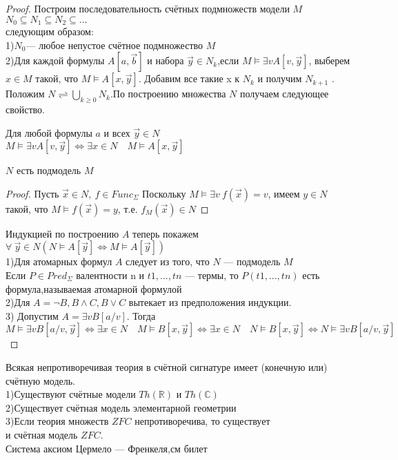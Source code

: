 \begin{proof}
	Построим последовательность счётных подмножеств модели $M$\\
	$N_{0} \subseteq N_{1} \subseteq N_{2} \subseteq \ldots$\\
	следующим образом:\\
	1)$N_0$— любое непустое счётное подмножество $M$\\
	2)Для каждой формулы $A[a, \vec{b}]$ и набора $\vec{y} \in N_{k}$,если $M \vDash \exists v A[v, \vec{y}]$,
	выберем $x \in M$
	такой, что $M \vDash A[x, \vec{y}]$. Добавим все такие x к $N_k$ и получим $N_{k+1}$ .\\
	Положим $N \rightleftharpoons \bigcup_{k \geq 0} N_{k}$.По построению множества $N$ получаем следующее
	свойство.
	\begin{lemma}
		Для любой формулы $a$ и всех $\vec{y} \in N$\\
		$M \vDash \exists v A[v, \vec{y}] \Longleftrightarrow \exists x \in N \quad M \vDash A[x, \vec{y}]$
	\end{lemma}
	\begin{lemma}
		$N$ есть подмодель $M$
	\end{lemma}
	\begin{proof}
		Пусть $\vec{x} \in N,\:f\in Func_\Sigma$ Поскольку $M \vDash \exists v \: f(\vec{x})=v$, имеем $y\in N$
		такой, что $M \vDash f(\vec{x})=y$, т.е. $f_M(\vec{x})\in N$
	\end{proof}
	Индукцией по построению $A$ теперь покажем\\
	$\forall \: \vec{y}\in N (N \vDash A[\vec{y}] \Longleftrightarrow M \vDash A[\vec{y}])$\\
	1)Для атомарных формул $A$ следует из того, что $N$ — подмодель $M$\\
	\textcolor{mygray}{Если $P\in Pred_\Sigma$ валентности n и $t1, . . . ,tn$ —
	термы, то $P(t1, . . . ,tn)$ есть формула,называемая атомарной формулой}\\
	2)Для $A=\neg B, B \wedge C, B \vee C$ вытекает из предположения индукции.\\
	3) Допустим $A=\exists v B[a / v]$. Тогда\\
	$M \vDash \exists v B[a / v, \vec{y}] \Longleftrightarrow \exists x \in N \quad M \vDash B[x,
	\vec{y}]\Longleftrightarrow \exists x \in N \quad N \vDash B[x, \vec{y}] \Longleftrightarrow N \vDash \exists v
	B[a / v, \vec{y}]$
\end{proof}
\begin{corollary}
	Всякая непротиворечивая теория в счётной сигнатуре имеет (конечную или) счётную модель.\\
	1)Существуют счётные модели $Th(\mathbb{R})$ и $Th(\mathbb{C})$\\
	2)Существует счётная модель элементарной геометрии\\
	3)Если теория множеств $ZFC$ непротиворечива, то существует\\ и счётная модель $ZFC$.\\
	\textcolor{mygray}{Система аксиом Цермело — Френкеля,см билет}
\end{corollary}

